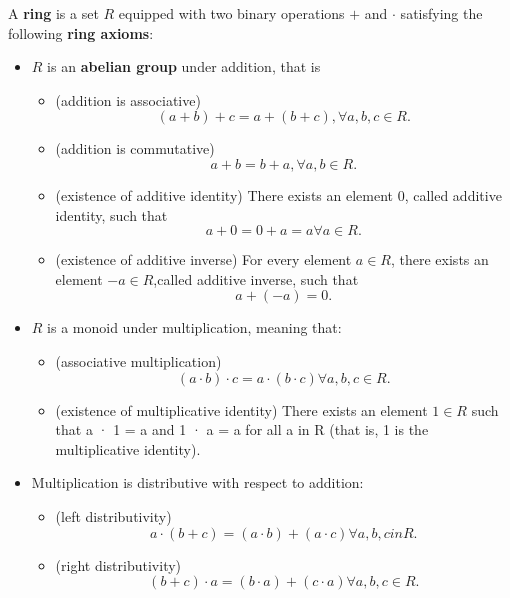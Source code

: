 \begin{refsection}
\begin{definition}[ring]
A \textbf{ring} is a set $R$ equipped with two binary operations $+$ and $\cdot$ satisfying the following \textbf{ring axioms}:
\begin{itemize}
	\item $R$ is an \textbf{abelian group} under addition, that is
	\begin{itemize}
		\item (addition is associative) $$(a+b)+c = a + (b+c),\forall a,b,c\in R.$$
		\item (addition is commutative) 
		$$a+b = b+a,\forall a,b\in R.$$
		\item (existence of additive identity) There exists an element 0, called additive identity, such that
		$$a+ 0=0+a = a \forall a\in R.$$
		\item (existence of additive inverse) For every element $a\in R$, there exists an element $-a \in R$,called additive inverse,  such that
		$$a + (-a) = 0.$$
	\end{itemize}
	\item $R$ is a monoid under multiplication, meaning that:
	\begin{itemize}
		\item (associative multiplication) $$(a\cdot b) \cdot c = a \cdot (b \cdot c) \forall a, b, c \in R.$$
		\item (existence of multiplicative identity) There exists an element $1 \in R$ such that a · 1 = a and 1 · a = a for all a in R   (that is, 1 is the multiplicative identity).
	\end{itemize}
\item Multiplication is distributive with respect to addition:
\begin{itemize}
	\item (left distributivity)
	$$a\cdot (b + c) = (a \cdot  b) + (a \cdot c) \forall a, b, c in R.$$
	\item (right distributivity)
	$$(b + c)\cdot a = (b \cdot a) + (c \cdot a) \forall a, b, c \in R.$$  
\end{itemize}
\end{itemize}	
\end{definition}


\end{refsection}
